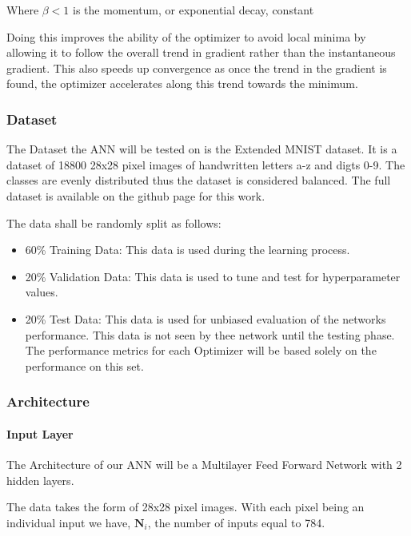 \documentclass{article}
\begin{document}
 \hfill \newline
Where $\beta<1$ is the momentum, or exponential decay, constant 
 \hfill \newline
 
Doing this improves the ability of the optimizer to avoid local minima by allowing it to follow the overall trend in gradient rather than the instantaneous gradient. This also speeds up convergence as once the trend in the gradient is found, the optimizer accelerates along this trend towards the minimum.
\hfill\newpage

\subsubsection{Dataset}

The Dataset the ANN will be tested on is the Extended MNIST dataset. It is a dataset of 18800 28x28 pixel images of handwritten letters a-z and digts 0-9. The classes are evenly distributed thus the dataset is considered balanced. The full dataset is available on the github page for this work. 

The data shall be randomly split as follows:
\begin{itemize}
	\item 60\% Training Data: This data is used during the learning process.
	\item 20\% Validation Data: This data is used to tune and test for hyperparameter values.
	\item 20\% Test Data: This data is used for unbiased evaluation of the networks performance. This data is not seen by thee network until the testing phase. The performance metrics for each Optimizer will be based solely on the performance on this set.
\end{itemize}

\subsubsection{Architecture}

\paragraph{Input Layer}
The Architecture of our ANN will be a Multilayer Feed Forward Network with 2 hidden layers.

The data takes the form of 28x28 pixel images. With each pixel being an individual input we have, $\boldsymbol{N}_i$, the number of inputs equal to 784.
\end{document}
